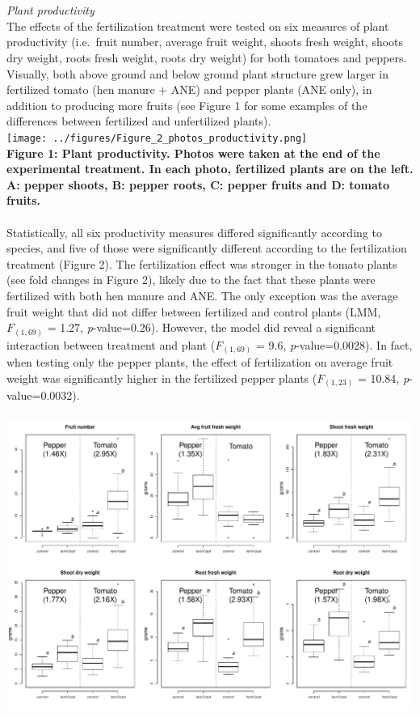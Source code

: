 \documentclass[11pt,]{article}
\begin{document}
~\\
\hspace*{0.333em}\\
\emph{Plant productivity}\\
The effects of the fertilization treatment were tested on six measures
of plant productivity (i.e.~fruit number, average fruit weight, shoots
fresh weight, shoots dry weight, roots fresh weight, roots dry weight)
for both tomatoes and peppers. Visually, both above ground and below
ground plant structure grew larger in fertilized tomato (hen manure +
ANE) and pepper plants (ANE only), in addition to producing more fruits
(see Figure 1 for some examples of the differences between fertilized
and unfertilized plants). ~\\
\texttt{[image: ../figures/Figure\_2\_photos\_productivity.png]}\\
\textbf{Figure 1: Plant productivity. Photos were taken at the end of
the experimental treatment. In each photo, fertilized plants are on the
left. A: pepper shoots, B: pepper roots, C: pepper fruits and D: tomato
fruits.}\\
\hspace*{0.333em}\\
Statistically, all six productivity measures differed significantly
according to species, and five of those were significantly different
according to the fertilization treatment (Figure 2). The fertilization
effect was stronger in the tomato plants (see fold changes in Figure 2),
likely due to the fact that these plants were fertilized with both hen
manure and ANE. The only exception was the average fruit weight that did
not differ between fertilized and control plants (LMM, \(F_{(1,69)}\) =
1.27, \emph{p}-value=0.26). However, the model did reveal a significant
interaction between treatment and plant (\(F_{(1,69)}\) = 9.6,
\emph{p}-value=0.0028). In fact, when testing only the pepper plants,
the effect of fertilization on average fruit weight was significantly
higher in the fertilized pepper plants (\(F_{(1,23)}\) = 10.84,
\emph{p}-value=0.0032).\\
\hspace*{0.333em}\\
\includegraphics[width=6.25000in]{../figures/Figure_3_productivity.pdf}\\
\end{document}
